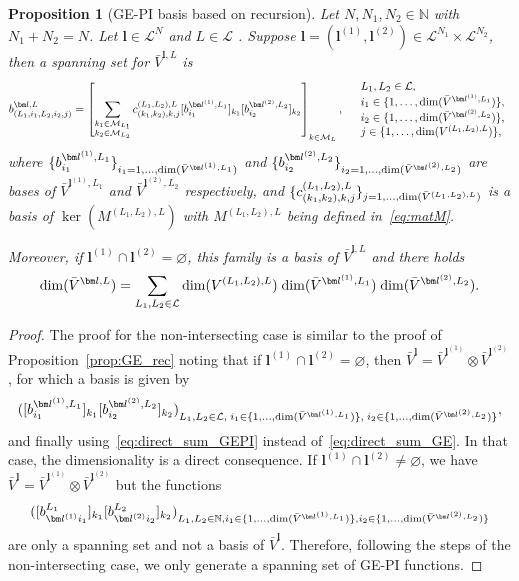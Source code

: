 \documentclass{article}
\newcommand{\bV}{{\bar V}}
\newcommand{\dimge}[2]{\dim(V^{#1,#2})}
\newcommand{\dimpi}[2]{\dim(\bV^{#1,#2})}
\newtheorem{proposition}[theorem]{Proposition}
\numberwithin{equation}{section}
\def\N{\mathbb{N}}
\def\bl{{\bm l}}
\def\calM{\mathcal{M}}
\def\calL{\mathcal{L}}
\def\Nat{{N}}
\def\dim{{{\rm dim}}}
\begin{document}
{\begin{proposition}[GE-PI basis based on recursion]
\label{prop:GEPI_rec}
Let $N,N_1,N_2\in \N$ with $N_1+N_2=N$.
Let $\bl\in\calL^\Nat$ and $L\in\calL$ . Suppose $\bl = (\bl^{(1)}, \bl^{(2)})\in\calL^{\Nat_1}\times\calL^{\Nat_2}$, then a spanning set for $\bV^{\bl,L}$ is 
\[
        b^{\bl,L}_{(L_1,i_1,L_2,i_2,j)} = \left[ \sum_{\substack{k_1\in\calM_{L_1} \\  k_2\in\calM_{L_2}}}  
        c_{(k_1,k_2), k,j}^{(L_1,L_2),L}
        [b^{\bl^{(1)},L_1}_{i_1}]_{k_1} [b^{\bl^{(2)},L_2}_{i_2}]_{k_2} \right]_{k\in \calM_L}, \quad
        \begin{array}{l}
         L_1,L_2\in\calL,   \\
         i_1\in\{1,\ldots, \dimpi{\bl^{(1)}}{L_1}\}, \\
         i_2\in\{1,\ldots, \dimpi{\bl^{(2)}}{L_2}\},\\
         j \in \{1,\ldots,\dimge{(L_1,L_2)}{L}\},
    \end{array}
\]
where $\{b^{\bl^{(1)},L_1}_{i_1}\}_{i_1 = 1,\ldots, \dimpi{\bl^{(1)}}{L_1}}$ and 
$\{b^{\bl^{(2)},L_2}_{i_2}\}_{i_2 = 1,\ldots, \dimpi{\bl^{(2)}}{L_2}}$ are bases of $\bV^{\bl^{(1)},L_1}$ and $\bV^{\bl^{(2)},L_2}$
respectively, and
$\{c_{(k_1,k_2), k,j}^{(L_1,L_2),L}\}_{j=1,\ldots,\dimpi{(L_1,L_2)}{L}}$ is a basis of $\ker(M^{(L_1,L_2),L})$ with $M^{(L_1,L_2),L}$ being defined in~\eqref{eq:matM}. 

Moreover, if $\bl^{(1)} \cap \bl^{(2)} = \varnothing$, this family is a basis of $\bV^{\bl,L}$ and there holds
\begin{equation*}
    \dimpi{\bl}{L} = \sum_{L_1,L_2\in\calL}
    \dimge{(L_1,L_2)}{L}
    \;
    \dimpi{\bl^{(1)}}{L_1} \;
    \dimpi{\bl^{(2)}}{L_2}.
\end{equation*}
\end{proposition}
\begin{proof}
    The proof for the non-intersecting case is similar to the proof of Proposition~\ref{prop:GE_rec} 
    noting that if $\bl^{(1)} \cap \bl^{(2)} = \varnothing$,
     then $\bV^\bl = \bV^{\bl^{(1)}} \otimes \bV^{\bl^{(2)}}$, for which a basis is given by
     \[
    ([b^{\bl^{(1)},L_1}_{i_1}]_{k_1} [b^{\bl^{(2)},L_2}_{i_2}]_{k_2})_{L_1,L_2 \in\calL,\; i_1 \in \{ 1, \ldots, \dimpi{\bl^{(1)}}{L_1}\},\; i_2 \in \{1, \ldots, \dimpi{\bl^{(2)}}{L_2}\} },
    \]
    and finally using~\eqref{eq:direct_sum_GEPI} instead of~\eqref{eq:direct_sum_GE}. In that case, the dimensionality is a direct consequence.
    If $\bl^{(1)} \cap \bl^{(2)} \neq \varnothing$, we have $\bV^\bl = \bV^{\bl^{(1)}} \otimes \bV^{\bl^{(2)}}$ but the functions \[
    ([b^{L_1}_{\bl^{(1)} i_1}]_{k_1} [b^{L_2}_{\bl^{(2)} i_2}]_{k_2})_{L_1,L_2 \in \N, i_1 \in \{ 1, \ldots, \dimpi{\bl^{(1)}}{L_1}\}, i_2 \in \{1, \ldots, \dimpi{\bl^{(2)}}{L_2}\} } 
    \]
    are only a spanning set and not a basis of  $\bV^\bl$.
    Therefore, following the steps of the non-intersecting case, we only generate a spanning set of GE-PI functions.
\end{proof}

}
\end{document}
